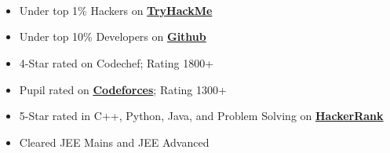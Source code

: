 \documentclass[10pt,a4paper,ragged2e,withhyper]{altacv}
\begin{document}
\begin{paracol}{2}
\bigskip
\divider
\bigskip

 \\
  \\
  \\
  

\medskip


\begin{itemize}
    \item Under top 1\% Hackers on \textbf{\href{https://tryhackme.com/p/Aniton}{TryHackMe}}
    \item Under top 10\% Developers on \textbf{\href{https://github.com/madhav-MKNc}{Github}}
    \item 4-Star rated on Codechef; Rating 1800+
    \item Pupil rated on \textbf{\href{https://codeforces.com/profile/a9_10}{Codeforces}}; Rating 1300+
    \item 5-Star rated in C++, Python, Java, and Problem Solving on \textbf{\href{https://www.hackerrank.com/profile/gammusicrew}{HackerRank}}
    \item Cleared JEE Mains and JEE Advanced
\end{itemize}

\end{paracol}
\end{document}

